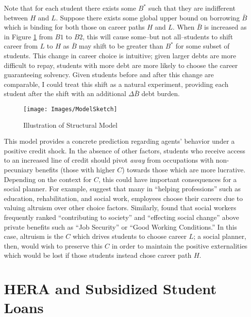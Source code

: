 \documentclass[12pt]{article}
\begin{document}
	Note that for each student there exists some $B^*$ such that they are indifferent between $H$ and $L$. Suppose there exists some global upper bound on borrowing $\bar{B}$ which is binding for both those on career paths $H$ and $L$. When $\bar{B}$ is increased as in Figure \ref{struc} from $B1$ to $B2$, this will cause some--but not all--students to shift career from $L$ to $H$ as $\bar{B}$ may shift to be greater than $B^*$ for some subset of students. This change in career choice is intuitive; given larger debts are more difficult to repay, students with more debt are more likely to choose the career guaranteeing solvency. Given students before and after this change are comparable, I could treat this shift as a natural experiment, providing each student after the shift with an additional $\Delta\bar{B}$ debt burden. 
	
		
	\begin{figure}
		\centering
		\caption{Illustration of Structural Model}
		\label{struc}
		\texttt{[image: Images/ModelSketch]}
	\end{figure}

	This model provides a concrete prediction regarding agents' behavior under a positive credit shock. In the absence of other factors, students who receive access to an increased line of credit should pivot \emph{away} from occupations with non-pecuniary benefits (those with higher $C$) towards those which are more lucrative. Depending on the context for $C$, this could have important consequences for a social planner. For example, \textcite{benshem1991} suggest that many in ``helping professions'' such as education, rehabilitation, and social work, employees choose their careers due to valuing altruism over other choice factors. Similarly, \textcite{hanson1995} found that social workers frequently ranked ``contributing to society'' and ``effecting social change'' above private benefits such as ``Job Security'' or ``Good Working Conditions.'' In this case, altruism is the $C$ which drives students to choose career $L$; a social planner, then, would wish to preserve this $C$ in order to maintain the positive externalities which would be lost if those students instead chose career path $H$.

	\section{HERA and Subsidized Student Loans}
	
\end{document}
